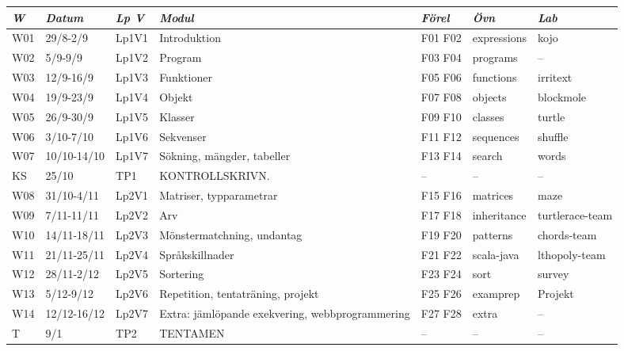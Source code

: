 \begin{tabular}{l|l|l|l|l|l|l}
\textit{W} & \textit{Datum} & \textit{Lp V} & \textit{Modul} & \textit{Förel} & \textit{Övn} & \textit{Lab} \\ \hline \hline
W01 & 29/8-2/9 & Lp1V1 & Introduktion & F01 F02 & expressions & kojo \\
W02 & 5/9-9/9 & Lp1V2 & Program & F03 F04 & programs & -- \\
W03 & 12/9-16/9 & Lp1V3 & Funktioner & F05 F06 & functions & irritext \\
W04 & 19/9-23/9 & Lp1V4 & Objekt & F07 F08 & objects & blockmole \\
W05 & 26/9-30/9 & Lp1V5 & Klasser & F09 F10 & classes & turtle \\
W06 & 3/10-7/10 & Lp1V6 & Sekvenser & F11 F12 & sequences & shuffle \\
W07 & 10/10-14/10 & Lp1V7 & Sökning, mängder, tabeller & F13 F14 & search & words \\
KS & 25/10 & TP1 & KONTROLLSKRIVN. & -- & -- & -- \\
W08 & 31/10-4/11 & Lp2V1 & Matriser, typparametrar & F15 F16 & matrices & maze \\
W09 & 7/11-11/11 & Lp2V2 & Arv & F17 F18 & inheritance & turtlerace-team \\
W10 & 14/11-18/11 & Lp2V3 & Mönstermatchning, undantag & F19 F20 & patterns & chords-team \\
W11 & 21/11-25/11 & Lp2V4 & Språkskillnader & F21 F22 & scala-java & lthopoly-team \\
W12 & 28/11-2/12 & Lp2V5 & Sortering & F23 F24 & sort & survey \\
W13 & 5/12-9/12 & Lp2V6 & Repetition, tentaträning, projekt & F25 F26 & examprep & Projekt \\
W14 & 12/12-16/12 & Lp2V7 & Extra: jämlöpande exekvering, webbprogrammering & F27 F28 & extra & -- \\
T & 9/1 & TP2 & TENTAMEN & -- & -- & -- \\
\end{tabular}
